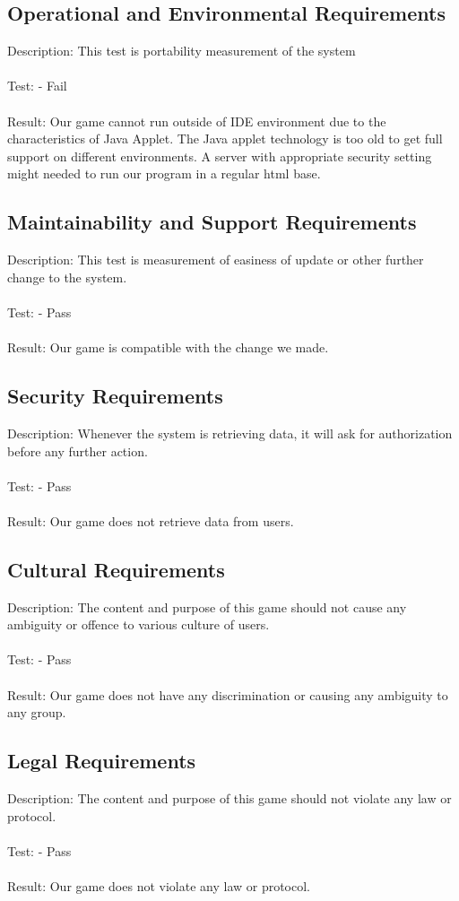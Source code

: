 \documentclass[12pt, titlepage]{article}
\begin{document}
\subsection{Operational and Environmental Requirements}
Description: This test is portability measurement of the system \\\\
Test:  - Fail\\\\
Result: Our game cannot run outside of IDE environment due to the characteristics of Java Applet. The Java applet technology is too old to get full support on different environments. A server with appropriate security setting might needed to run our program in a regular html base.


\subsection{Maintainability and Support Requirements}
Description: This test is measurement of easiness of update or other further change to the system.\\\\
Test:  - Pass\\\\
Result: Our game is compatible with the change we made.

\subsection{Security Requirements}
Description: Whenever the system is retrieving data, it will ask for authorization before any further action.\\\\
Test:  - Pass\\\\
Result: Our game does not retrieve data from users.

\subsection{Cultural Requirements}
Description: The content and purpose of this game should not cause any ambiguity or offence to various culture of users.\\\\
Test:  - Pass\\\\
Result: Our game does not have any discrimination or causing any ambiguity to any group.

\subsection{Legal Requirements}
Description: The content and purpose of this game should not violate any law or protocol.\\\\
Test:  - Pass\\\\
Result: Our game does not violate any law or protocol.
\end{document}
